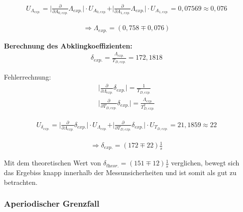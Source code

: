 \documentclass[a4paper]{scrartcl}
\numberwithin{equation}{subsection}
\begin{document}
\begin{align*}
U_{\Lambda_{\textit{exp.}}} = \vert \frac{\partial}{\partial A_{0,\textit{exp.}}}\Lambda_{\textit{exp.}}\vert \cdot U_{A_{0,\textit{exp.}}} + \vert \frac{\partial}{\partial A_{1,\textit{exp.}}}\Lambda_{\textit{exp.}}\vert \cdot U_{A_{1,\textit{exp.}}} = 0,07569 \approx 0,076 
\end{align*}

\begin{align*}
\Rightarrow \Lambda_{\textit{exp.}} = (0,758 \mp 0,076)
\end{align*}

\textbf{Berechnung des Abklingkoeffizienten:}
\begin{align}
\delta_{\textit{exp.}} = \frac{\Lambda_{\textit{exp.}}}{T_{D,\textit{exp.}}} = 172,1818
\end{align}

Fehlerrechnung:
\begin{align*}
\vert \frac{\partial}{\partial \Lambda_{\textit{exp.}}}\delta_{\textit{exp.}}\vert = \frac{1}{T_{D,\textit{exp.}}} \\
\vert \frac{\partial}{\partial T_{D,\textit{exp.}}}\delta_{\textit{exp.}}\vert = \frac{\Lambda_{\textit{exp.}}}{T_{D,\textit{exp.}}^2}
\end{align*}

\begin{align*}
U_{\delta_{\textit{exp.}}} = \vert \frac{\partial}{\partial \Lambda_{\textit{exp.}}}\delta_{\textit{exp.}}\vert \cdot U_{\Lambda_{\textit{exp.}}} + \vert \frac{\partial}{\partial T_{D,\textit{exp.}}}\delta_{\textit{exp.}}\vert \cdot U_{T_{D,\textit{exp.}}} = 21,1859 \approx 22
\end{align*}

\begin{align*}
\Rightarrow \delta_{\textit{exp.}} = (172 \mp 22) \frac{1}{s}
\end{align*}

Mit dem theoretischen Wert von $\delta_{\textit{theor.}} = (151 \mp 12) \frac{1}{s}$ verglichen, bewegt sich das Ergebiss knapp innerhalb der Messunsicherheiten und ist somit als gut zu betrachten.



\subsubsection{Aperiodischer Grenzfall}
\end{document}
